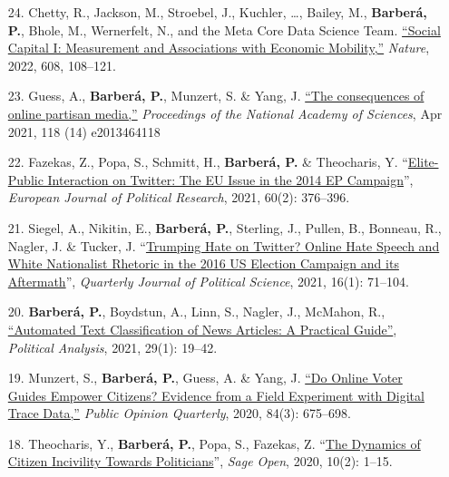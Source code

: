 \documentclass[margin,line,11pt]{resume}
\begin{document}
\begin{resume}
\begin{itemize}[leftmargin=5.5mm]
\item[24.] Chetty, R., Jackson, M., Stroebel, J., Kuchler, \ldots, Bailey, M., \textbf{Barber\'{a}, P.}, Bhole, M., Wernerfelt, N., and the Meta Core Data Science Team. \href{https://www.nature.com/articles/s41586-022-04996-4}{``Social Capital I: Measurement and Associations with Economic Mobility,''} \textit{Nature}, 2022, 608, 108--121. 

\item[23.] Guess, A., \textbf{Barber\'{a}, P.}, Munzert, S. \& Yang, J. \href{https://www.pnas.org/content/118/14/e2013464118}{``The consequences of online partisan media,''} \textit{Proceedings of the National Academy of Sciences}, Apr 2021, 118 (14) e2013464118

\item[22.] Fazekas, Z., Popa, S., Schmitt, H., \textbf{Barber\'{a}, P.} \& Theocharis, Y. ``\href{https://ejpr.onlinelibrary.wiley.com/doi/10.1111/1475-6765.12402}{Elite-Public Interaction on Twitter: The EU Issue in the 2014 EP Campaign}'', \textit{European Journal of Political Research}, 2021, 60(2): 376--396.

\item[21.] Siegel, A., Nikitin, E., \textbf{Barber\'{a}, P.}, Sterling, J., Pullen, B., Bonneau, R., Nagler, J. \& Tucker, J. ``\href{http://dx.doi.org/10.1561/100.00019045}{Trumping Hate on Twitter? Online Hate Speech and White Nationalist Rhetoric in the 2016 US Election Campaign and its Aftermath}'', \textit{Quarterly Journal of Political Science}, 2021, 16(1): 71--104.

\item[20.] \textbf{Barber\'{a}, P.}, Boydstun, A., Linn, S., Nagler, J., McMahon, R.,  \href{https://www.cambridge.org/core/journals/political-analysis/article/automated-text-classification-of-news-articles-a-practical-guide/10462DB284B1CD80C0FAE796AD786BC6}{``Automated Text Classification of News Articles: A Practical Guide''}, \textit{Political Analysis}, 2021, 29(1): 19--42.

\item[19.] Munzert, S., \textbf{Barber\'{a}, P.}, Guess, A. \& Yang, J. \href{https://academic.oup.com/poq/advance-article/doi/10.1093/poq/nfaa037/6104133}{``Do Online Voter Guides Empower Citizens? Evidence from a Field Experiment with Digital Trace Data,''} \textit{Public Opinion Quarterly}, 2020, 84(3): 675--698.

\item[18.] Theocharis, Y., \textbf{Barber\'{a}, P.}, Popa, S., Fazekas, Z. ``\href{https://journals.sagepub.com/doi/full/10.1177/2158244020919447}{The Dynamics of Citizen Incivility Towards Politicians}'', \textit{Sage Open}, 2020, 10(2): 1--15.


\end{itemize}
\end{resume}
\end{document}
